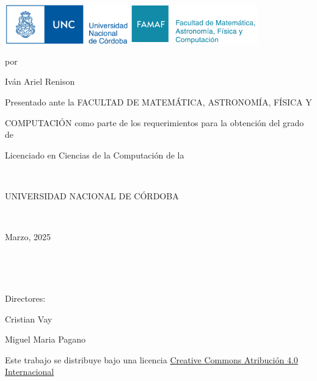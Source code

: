 \begin{center}
  \thispagestyle{empty} %

  \vspace{0.5cm}

  \begin{minipage}[t]{\textwidth}
      \raggedright
      \includegraphics[height=1.7cm]{logos/unc.jpg} %
      \hfill
      \includegraphics[height=1.7cm]{logos/famaf.png} %
  \end{minipage}

  \vspace{3cm} %

  \begin{huge}
    \textbf{\tituloTesis}
  \end{huge}

  \vspace{0.3cm}

  por

  {\Large Iván Ariel Renison}

  \vspace{2cm}

  Presentado ante la FACULTAD DE MATEMÁTICA, ASTRONOMÍA, FÍSICA Y

  COMPUTACIÓN como parte de los requerimientos para la obtención del grado de

  Licenciado en Ciencias de la Computación de la

  \

  UNIVERSIDAD NACIONAL DE CÓRDOBA

  \

  Marzo, 2025

  \

  \

  \begin{large}
    Directores:

    Cristian Vay

    Miguel Maria Pagano
  \end{large}


  \vfill

  \begin{huge}
    \ccLogo
  \end{huge}

  Este trabajo se distribuye bajo una licencia \href{https://creativecommons.org/licenses/by/4.0/?ref=chooser-v1}{Creative Commons Atribución 4.0 Internacional} \ccby

  \vspace{0.5cm}
\end{center}
\newpage
